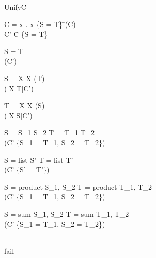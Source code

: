 \documentclass{article}
\begin{document}
\begin{algorithm}{Unify}{C}
    \begin{IF}{C = \emptyset}
        \lambda x . x
    \ELSE
        \{S = T\} \= (C) \\
        C' \= C \setminus \{S = T\} \\
        \begin{SWITCH}
        \item{S = T} \\
            (C')
        \item{S = X \hspace{1mm} \wedge \hspace{1mm} X \not\in {}(T)} \\
            ([X \mapsto T]C') \circ [X \mapsto T]
        \item{T = X \hspace{1mm} \wedge \hspace{1mm} X \not\in {}(S)} \\
            ([X \mapsto S]C') \circ [X \mapsto S]
        \item{S = S_1 \rightarrow S_2 \hspace{1mm} \wedge \hspace{1mm} T = T_1 \rightarrow T_2} \\
            (C' \cup \{S_1 = T_1, S_2 = T_2\})
        \item{S = list \hspace{1mm} S' \hspace{1mm} \wedge \hspace{1mm} T = list \hspace{1mm} T'} \\
            (C' \cup \{S' = T'\})
        \item{S = product \hspace{1mm} S_1, S_2 \hspace{1mm} \wedge \hspace{1mm} T = product \hspace{1mm} T_1, T_2} \\
            (C' \cup \{S_1 = T_1, S_2 = T_2\})
        \item{S = sum \hspace{1mm} S_1, S_2 \hspace{1mm} \wedge \hspace{1mm} T = sum \hspace{1mm} T_1, T_2} \\
            (C' \cup \{S_1 = T_1, S_2 = T_2\})
        \item{\DEFAULT} \\
            fail
        \end{SWITCH}
    \end{IF}
\end{algorithm}
\end{document}
